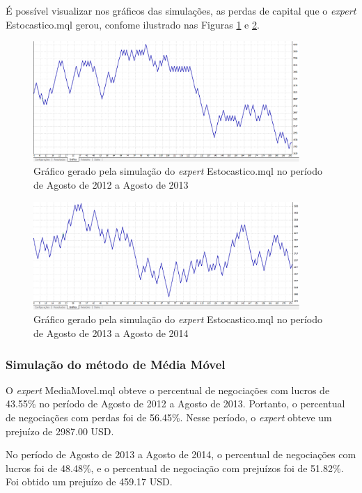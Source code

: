 É possível visualizar nos gráficos das simulações, as perdas de capital que o \textit{expert} Estocastico.mql gerou, confome ilustrado nas Figuras \ref{protocoloEst3} e \ref{protocoloEst4}.

\begin{figure}[H]
\centering
\includegraphics[width=0.9\textwidth]{figuras/protocoloEst3}
\caption{Gráfico gerado pela simulação do \textit{expert} Estocastico.mql no período de Agosto de 2012 a Agosto de 2013} 
\label{protocoloEst3}
\end{figure}

\begin{figure}[H]
\centering
\includegraphics[width=0.9\textwidth]{figuras/protocoloEst4}
\caption{Gráfico gerado pela simulação do \textit{expert} Estocastico.mql no período de Agosto de 2013 a Agosto de 2014} 
\label{protocoloEst4}
\end{figure}

\subsubsection{Simulação do método de Média Móvel}

O \textit{expert} MediaMovel.mql obteve o percentual de negociações com lucros de 43.55\% no período de Agosto de 2012 a Agosto de 2013. Portanto, o percentual de negociações com perdas foi de 56.45\%. Nesse período, o \textit{expert} obteve um prejuízo de 2987.00 USD. 

No período de Agosto de 2013 a Agosto de  2014, o percentual de negociações com lucros foi de 48.48\%, e o percentual de negociação com prejuízos foi de 51.82\%.  Foi obtido um prejuízo de 459.17 USD. 

